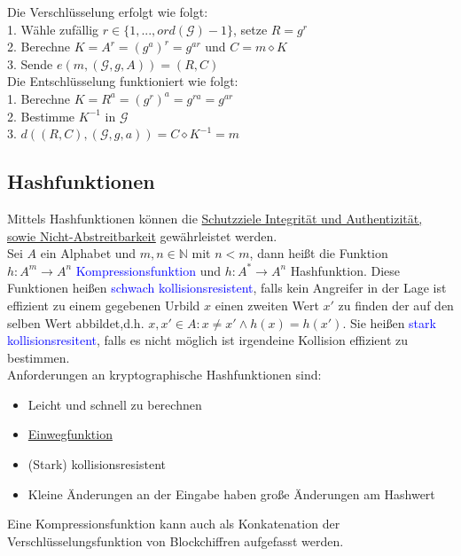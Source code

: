 \documentclass[a4paper,12pt,leqno]{article}
\newcommand{\blue}[1]{\textcolor{blue}{#1}}
\begin{document}
Die Verschlüsselung erfolgt wie folgt:\\
1. Wähle zufällig $r\in \{1,...,ord(\mathcal{G})-1\}$, setze $R = g^r$\\
2. Berechne $K=A^r=(g^a)^r=g^{ar}$ und $C=m\diamond K$\\
3. Sende $e(m,(\mathcal{G},g,A))=(R,C)$\\

Die Entschlüsselung funktioniert wie folgt:\\
1. Berechne $K=R^a=(g^r)^a=g^{ra}=g^{ar}$\\
2. Bestimme $K^{-1}$ in $\mathcal{G}$\\
3. $d((R,C),(\mathcal{G},g,a))=C\diamond K^{-1}=m$

\subsection{Hashfunktionen}
Mittels Hashfunktionen können die \hyperref[item:schutzziele]{Schutzziele Integrität und Authentizität, sowie Nicht-Abstreitbarkeit} gewährleistet werden.\\
Sei $A$ ein Alphabet und $m,n\in\mathbb{N}$ mit $n<m$, dann heißt die Funktion $h: A^m\rightarrow A^n$ \blue{Kompressionsfunktion} und $h: A^*\rightarrow A^n$ Hashfunktion. Diese Funktionen heißen \blue{schwach kollisionsresistent}, falls kein Angreifer in der Lage ist effizient zu einem gegebenen Urbild $x$ einen zweiten Wert $x'$ zu finden der auf den selben Wert abbildet,d.h. $x,x'\in A : x\neq x' \wedge h(x)=h(x')$. Sie heißen \blue{stark kollisionsresitent}, falls es nicht möglich ist irgendeine Kollision effizient zu bestimmen.\\
Anforderungen an kryptographische Hashfunktionen sind:
\begin{itemize}
\item Leicht und schnell zu berechnen
\item \hyperref[def:Einwegfunktion]{Einwegfunktion}
\item (Stark) kollisionsresistent
\item Kleine Änderungen an der Eingabe haben große Änderungen am Hashwert
\end{itemize}
Eine Kompressionsfunktion kann auch als Konkatenation der Verschlüsselungsfunktion von Blockchiffren aufgefasst werden.
\end{document}
